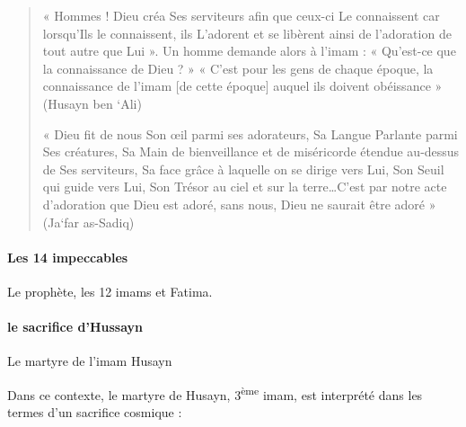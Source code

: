 \begin{quote}


« Hommes ! Dieu créa Ses serviteurs afin que ceux-ci Le connaissent car
lorsqu'Ils le connaissent, ils L'adorent et se libèrent ainsi de
l'adoration de tout autre que Lui ». Un homme demande alors à l'imam : «
Qu'est-ce que la connaissance de Dieu ? » « C'est pour les gens de
chaque époque, la connaissance de l'imam {[}de cette époque{]} auquel
ils doivent obéissance » (Husayn ben `Ali)

« Dieu fit de nous Son œil parmi ses adorateurs, Sa Langue Parlante
parmi Ses créatures, Sa Main de bienveillance et de miséricorde étendue
au-dessus de Ses serviteurs, Sa face grâce à laquelle on se dirige vers
Lui, Son Seuil qui guide vers Lui, Son Trésor au ciel et sur la
terre\ldots C'est par notre acte d'adoration que Dieu est adoré, sans
nous, Dieu ne saurait être adoré » (Ja`far as-Sadiq)


\end{quote}
 \paragraph{Les 14 impeccables} Le prophète, les 12 imams et Fatima. 
 
 \paragraph{le sacrifice d'Hussayn}
 
{Le martyre de l'imam Husayn}

Dans ce contexte, le martyre de Husayn, 3\textsuperscript{ème} imam, est
interprété dans les termes d'un sacrifice cosmique :

